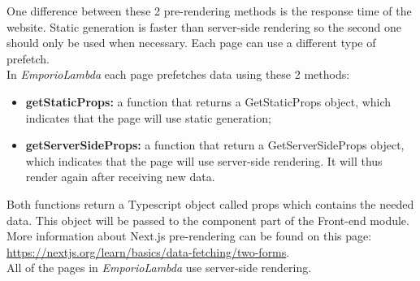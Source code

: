 One difference between these 2 pre-rendering methods is the response time of the website.
Static generation is faster than server-side rendering so the second one should only be used when necessary. Each page can use a different type of prefetch.\\
In \textit{EmporioLambda} each page prefetches data using these 2 methods:
\begin{itemize}
\item \textbf{getStaticProps:} a function that returns a GetStaticProps object, which indicates that the page will use static generation;
\item \textbf{getServerSideProps:} a function that return a GetServerSideProps object, which indicates that the page will use server-side rendering. It will thus render again after receiving new data.
\end{itemize}
Both functions return a Typescript object called props which contains the needed data. This object will be passed to the component part of the Front-end module.\\
More information about Next.js pre-rendering can be found on this page:\\
\url{https://nextjs.org/learn/basics/data-fetching/two-forms}.\\
All of the pages in \textit{EmporioLambda} use server-side rendering.
